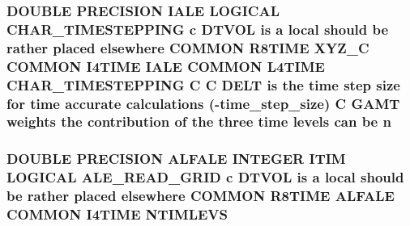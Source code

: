 \hypertarget{home_2abonfi_2_c_f_d__codes_2_eul_f_s_83_84_2include_2time_8com_a24bdc4a048267ff98f6f8137112e6f2f}{
\subsubsection[{n}]{\setlength{\rightskip}{0pt plus 5cm}D\-O\-U\-B\-L\-E P\-R\-E\-C\-I\-S\-I\-O\-N I\-A\-L\-E L\-O\-G\-I\-C\-A\-L C\-H\-A\-R\-\_\-\-T\-I\-M\-E\-S\-T\-E\-P\-P\-I\-N\-G c {\bf D\-T\-V\-O\-L} is a local should be rather placed elsewhere C\-O\-M\-M\-O\-N R8\-T\-I\-M\-E {\bf X\-Y\-Z\-\_\-\-C} C\-O\-M\-M\-O\-N I4\-T\-I\-M\-E I\-A\-L\-E C\-O\-M\-M\-O\-N L4\-T\-I\-M\-E C\-H\-A\-R\-\_\-\-T\-I\-M\-E\-S\-T\-E\-P\-P\-I\-N\-G C C {\bf D\-E\-L\-T} is the time {\bf step} size for time accurate calculations (-\/time\-\_\-step\-\_\-size) C {\bf G\-A\-M\-T} weights the contribution of the three time levels can be n}}\label{home_2abonfi_2_c_f_d__codes_2_eul_f_s_83_84_2include_2time_8com_a24bdc4a048267ff98f6f8137112e6f2f}
\hypertarget{home_2abonfi_2_c_f_d__codes_2_eul_f_s_83_84_2include_2time_8com_a2ca5d60c37515ae15ddd21e5da9abcf1}{
\subsubsection[{N\-T\-I\-M\-L\-E\-V\-S}]{\setlength{\rightskip}{0pt plus 5cm}D\-O\-U\-B\-L\-E P\-R\-E\-C\-I\-S\-I\-O\-N {\bf A\-L\-F\-A\-L\-E} I\-N\-T\-E\-G\-E\-R {\bf I\-T\-I\-M} L\-O\-G\-I\-C\-A\-L {\bf A\-L\-E\-\_\-\-R\-E\-A\-D\-\_\-\-G\-R\-I\-D} c {\bf D\-T\-V\-O\-L} is a local should be rather placed elsewhere C\-O\-M\-M\-O\-N R8\-T\-I\-M\-E {\bf A\-L\-F\-A\-L\-E} C\-O\-M\-M\-O\-N I4\-T\-I\-M\-E N\-T\-I\-M\-L\-E\-V\-S}}\label{home_2abonfi_2_c_f_d__codes_2_eul_f_s_83_84_2include_2time_8com_a2ca5d60c37515ae15ddd21e5da9abcf1}
